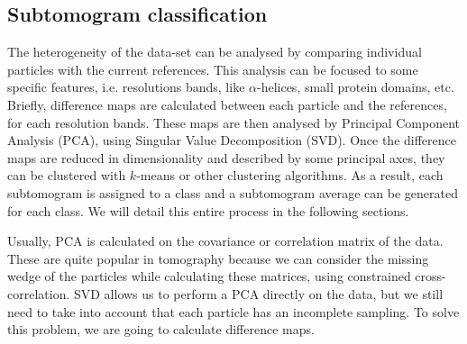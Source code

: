 \subsection{Subtomogram classification}

The heterogeneity of the data-set can be analysed by comparing individual particles with the current references. This analysis can be focused to some specific features, i.e. resolutions bands, like $\alpha$-helices, small protein domains, etc. Briefly, difference maps are calculated between each particle and the references, for each resolution bands. These maps are then analysed by Principal Component Analysis (PCA), using Singular Value Decomposition (SVD). Once the difference maps are reduced in dimensionality and described by some principal axes, they can be clustered with $k$-means or other clustering algorithms. As a result, each subtomogram is assigned to a class and a subtomogram average can be generated for each class. We will detail this entire process in the following sections.

Usually, PCA is calculated on the covariance or correlation matrix of the data. These are quite popular in tomography because we can consider the missing wedge of the particles while calculating these matrices, using constrained cross-correlation. SVD allows us to perform a PCA directly on the data, but we still need to take into account that each particle has an incomplete sampling. To solve this problem, we are going to calculate difference maps.



